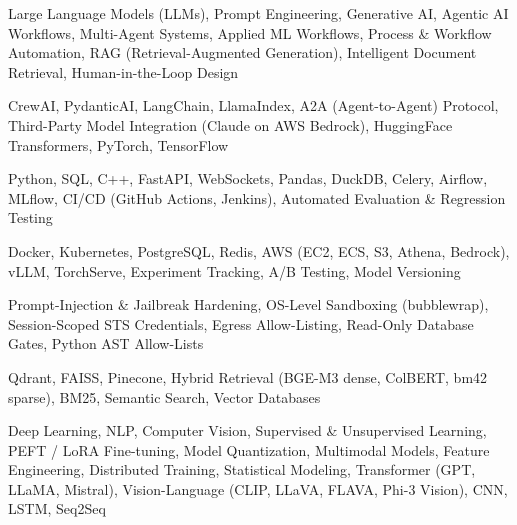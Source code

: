 \documentclass[letter,10pt]{article}
\begin{document}
 Large Language Models (LLMs), Prompt Engineering, Generative AI, Agentic AI Workflows, Multi-Agent Systems, Applied ML Workflows, Process \& Workflow Automation, RAG (Retrieval-Augmented Generation), Intelligent Document Retrieval, Human-in-the-Loop Design\par\vspace{2pt}

 CrewAI, PydanticAI, LangChain, LlamaIndex, A2A (Agent-to-Agent) Protocol, Third-Party Model Integration (Claude on AWS Bedrock), HuggingFace Transformers, PyTorch, TensorFlow\par\vspace{2pt}

 Python, SQL, C++, FastAPI, WebSockets, Pandas, DuckDB, Celery, Airflow, MLflow, CI/CD (GitHub Actions, Jenkins), Automated Evaluation \& Regression Testing\par\vspace{2pt}

 Docker, Kubernetes, PostgreSQL, Redis, AWS (EC2, ECS, S3, Athena, Bedrock), vLLM, TorchServe, Experiment Tracking, A/B Testing, Model Versioning\par\vspace{2pt}

 Prompt-Injection \& Jailbreak Hardening, OS-Level Sandboxing (bubblewrap), Session-Scoped STS Credentials, Egress Allow-Listing, Read-Only Database Gates, Python AST Allow-Lists\par\vspace{2pt}

 Qdrant, FAISS, Pinecone, Hybrid Retrieval (BGE-M3 dense, ColBERT, bm42 sparse), BM25, Semantic Search, Vector Databases\par\vspace{2pt}

 Deep Learning, NLP, Computer Vision, Supervised \& Unsupervised Learning, PEFT / LoRA Fine-tuning, Model Quantization, Multimodal Models, Feature Engineering, Distributed Training, Statistical Modeling, Transformer (GPT, LLaMA, Mistral), Vision-Language (CLIP, LLaVA, FLAVA, Phi-3 Vision), CNN, LSTM, Seq2Seq
\end{document}
